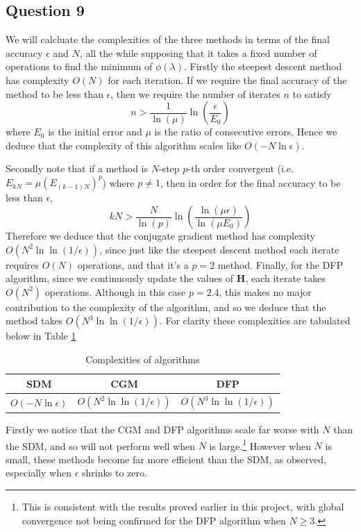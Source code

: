 \documentclass[10pt,a4paper,notitlepage]{article}
\newcommand{\h}{\mathbf{H}}
\begin{document}
\subsection*{\centering Question 9}
We will calcluate the complexities of the three methods in terms of the final accuracy $\epsilon$ and $N$, all the while supposing that it takes a fixed number of operations to find the minimum of $\phi(\lambda)$.
Firstly the steepest descent method has complexity $O(N)$ for each iteration. If we require the final accuracy of the method to be less than $\epsilon$, then we require the number of iterates $n$ to satisfy
\begin{equation}
n>\frac{1}{\ln(\mu)}\ln\left(\frac{\epsilon}{E_{0}}\right)
\end{equation}
where $E_{0}$ is the initial error and $\mu$ is the ratio of consecutive errors. Hence we deduce that the complexity of this algorithm scales like $O\left(-N\ln\epsilon\right)$. 

Secondly note that if a method is $N$-step $p$-th order convergent (i.e. $E_{kN}= \mu \left( E_{(k-1)N}\right)^{p}$) where $p\neq 1$, then in order for the final accuracy to be less than $\epsilon$,
\begin{equation}
kN>\frac{N}{\ln(p)}\ln\left(\frac{\ln(\mu \epsilon)}{\ln(\mu E_{0})}\right)
\end{equation}
Therefore we deduce that the conjugate gradient method has complexity $O\left(N^{2}\ln\ln(1/\epsilon)\right)$, since just like the steepest descent method each iterate requires $O(N)$ operations, and that it's a $p=2$ method. Finally, for the DFP algorithm, since we continuously update the values of $\h$, each iterate takes $O(N^{2})$ operations. Although in this case $p=2.4$, this makes no major contribution to the complexity of the algorithm, and so we deduce that the method takes $O\left(N^{3}\ln\ln(1/\epsilon)\right)$. For clarity these complexities are tabulated below in Table \ref{tb:13}

\begin{table}[H]
\centering
\begin{tabular}{c|c|c}
SDM & CGM & DFP\\
\hline
$O\left(-N\ln\epsilon\right)$ & $O\left(N^{2}\ln\ln\left(1/\epsilon\right)\right)$ & $O\left(N^{3}\ln\ln\left(1/\epsilon\right)\right)$\\
\end{tabular}
\caption{Complexities of algorithms}\label{tb:13}
\end{table}
Firstly we notice that the CGM and DFP algorithms scale far worse with $N$ than the SDM, and so will not perform well when $N$ is large.\footnote{This is consistent with the results proved earlier in this project, with global convergence not being confirmed for the DFP algorithm when $N\geq 3$.} However when $N$ is small, these methods become far more efficient than the SDM, as observed, especially when $\epsilon$ shrinks to zero. \\
\end{document}
